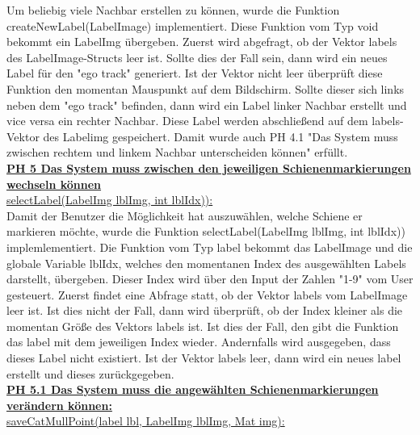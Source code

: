 \documentclass[11pt]{scrartcl}
\begin{document}
\noindent
Um beliebig viele Nachbar erstellen zu können, wurde die Funktion createNewLabel(LabelImage) implementiert. Diese Funktion vom Typ void bekommt ein LabelImg übergeben. Zuerst wird abgefragt, ob der Vektor labels des LabelImage-Structs leer ist. Sollte dies der Fall sein, dann wird ein neues Label für den "ego track" generiert. Ist der Vektor nicht leer überprüft diese Funktion den momentan Mauspunkt auf dem Bildschirm. Sollte dieser sich links neben dem "ego track" befinden, dann wird ein Label linker Nachbar erstellt und vice versa ein rechter Nachbar. Diese Label werden abschließend auf dem labels-Vektor des Labelimg gespeichert. Damit wurde auch PH 4.1 "Das System muss zwischen rechtem und linkem Nachbar unterscheiden können" erfüllt.
\\

\noindent
\underline{\textbf {PH 5 Das System muss zwischen den jeweiligen Schienenmarkierungen wechseln können}}
\\

\noindent
\underline{selectLabel(LabelImg lblImg, int lblIdx)):}
\\

\noindent
Damit der Benutzer die Möglichkeit hat auszuwählen, welche Schiene er markieren möchte, wurde die Funktion selectLabel(LabelImg lblImg, int lblIdx)) implemlementiert. Die Funktion vom Typ label bekommt das LabelImage und die globale Variable lblIdx, welches den momentanen Index des ausgewählten Labels darstellt, übergeben. Dieser Index wird über den Input der Zahlen "1-9" vom User gesteuert. Zuerst findet eine Abfrage statt, ob der Vektor labels vom LabelImage leer ist. Ist dies nicht der Fall, dann wird überprüft, ob der Index kleiner als die momentan Größe des Vektors labels ist. Ist dies der Fall, den gibt die Funktion das label mit dem jeweiligen Index wieder. Andernfalls wird ausgegeben, dass dieses Label nicht existiert. Ist der Vektor labels leer, dann wird ein neues label erstellt und dieses zurückgegeben.
\\

\noindent
\underline{\textbf {PH 5.1 Das System muss die angewählten Schienenmarkierungen verändern können:}}
\\

\noindent
\underline{saveCatMullPoint(label lbl, LabelImg lblImg, Mat img):}
\\
\end{document}
